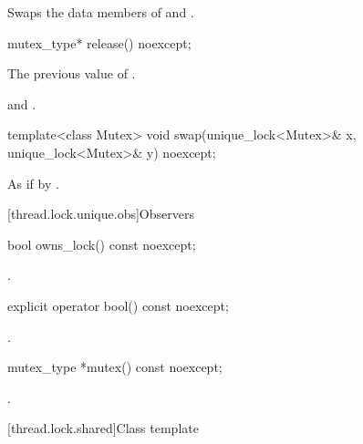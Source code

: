 \begin{itemdescr}
\pnum
\effects
Swaps the data members of  and .
\end{itemdescr}

%
\begin{itemdecl}
mutex_type* release() noexcept;
\end{itemdecl}

\begin{itemdescr}
\pnum
\returns
The previous value of .

\pnum
\ensures
{} and .
\end{itemdescr}

%
\begin{itemdecl}
template<class Mutex>
  void swap(unique_lock<Mutex>& x, unique_lock<Mutex>& y) noexcept;
\end{itemdecl}

\begin{itemdescr}
\pnum
\effects
As if by .
\end{itemdescr}

[thread.lock.unique.obs]{Observers}

%
\begin{itemdecl}
bool owns_lock() const noexcept;
\end{itemdecl}

\begin{itemdescr}
\pnum
\returns
{}.
\end{itemdescr}

%
\begin{itemdecl}
explicit operator bool() const noexcept;
\end{itemdecl}

\begin{itemdescr}
\pnum
\returns
{}.
\end{itemdescr}

%
\begin{itemdecl}
mutex_type *mutex() const noexcept;
\end{itemdecl}

\begin{itemdescr}
\pnum
\returns
{}.
\end{itemdescr}

[thread.lock.shared]{Class template }

